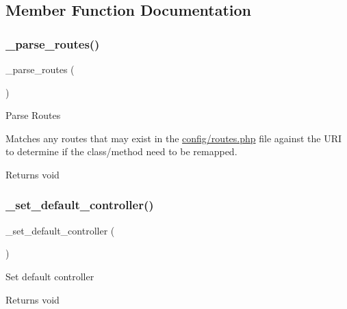 \subsection{Member Function Documentation}
\mbox{\label{class_c_i___router_a55a42fae865d03334b49baa5a5a6bd0b}} 
\subsubsection{\texorpdfstring{\+\_\+parse\+\_\+routes()}{\_parse\_routes()}}
{\footnotesize\ttfamily \+\_\+parse\+\_\+routes (\begin{DoxyParamCaption}{ }\end{DoxyParamCaption})\hspace{0.3cm}{\ttfamily [protected]}}

Parse Routes

Matches any routes that may exist in the \mbox{\hyperlink{routes_8php}{config/routes.\+php}} file against the U\+RI to determine if the class/method need to be remapped.

\begin{DoxyReturn}{Returns}
void 
\end{DoxyReturn}
\mbox{\label{class_c_i___router_a86b13067b062022251d2c7ecb4fb9492}} 
\subsubsection{\texorpdfstring{\+\_\+set\+\_\+default\+\_\+controller()}{\_set\_default\_controller()}}
{\footnotesize\ttfamily \+\_\+set\+\_\+default\+\_\+controller (\begin{DoxyParamCaption}{ }\end{DoxyParamCaption})\hspace{0.3cm}{\ttfamily [protected]}}

Set default controller

\begin{DoxyReturn}{Returns}
void 
\end{DoxyReturn}
\mbox{\label{class_c_i___router_a92b8b486926e4dea5fee4d71f80a472a}} 
